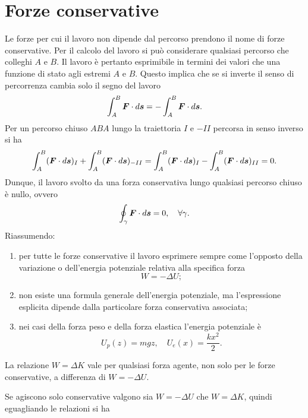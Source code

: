 \section{Forze conservative}
Le forze per cui il lavoro non dipende dal percorso prendono il nome di forze conservative. Per il calcolo del lavoro si può considerare qualsiasi percorso che colleghi $A$ e $B$. Il lavoro è pertanto esprimibile in termini dei valori che una funzione di stato agli estremi $A$ e $B$. Questo implica che se si inverte il senso di percorrenza cambia solo il segno del lavoro
\begin{equation}
    \int_A^B\bm{F}\cdot d\bm{s}=-\int_A^B\bm{F}\cdot d\bm{s}.
\end{equation}
Per un percorso chiuso $ABA$ lungo la traiettoria $I$ e $-II$ percorsa in senso inverso si ha
\begin{equation}
    \int_A^B(\bm{F}\cdot d\bm{s})_I+\int_A^B(\bm{F}\cdot d\bm{s})_{-II}=\int_A^B(\bm{F}\cdot d\bm{s})_I-\int_A^B(\bm{F}\cdot d\bm{s})_{II}=0.
\end{equation}
Dunque, il lavoro svolto da una forza conservativa lungo qualsiasi percorso chiuso è nullo, ovvero
\begin{equation}
    \oint_\gamma\bm{F}\cdot d\bm{s}=0,\quad\forall\gamma.
\end{equation}
Riassumendo:
\begin{enumerate}
    \item per tutte le forze conservative il lavoro esprimere sempre come l'opposto della variazione o dell'energia potenziale relativa alla specifica forza
    \begin{equation}
        W=-\Delta U;
    \end{equation}
    \item non esiste una formula generale dell'energia potenziale, ma l'espressione esplicita dipende dalla particolare forza conservativa associata;
    \item nei casi della forza peso e della forza elastica l'energia potenziale è
    \begin{equation}
        U_p(z)=mgz,\quad U_e(x)=\frac{kx^2}{2}.
    \end{equation}
\end{enumerate}
\begin{obs}
    La relazione $W=\Delta K$ vale per qualsiasi forza agente, non solo per le forze conservative, a differenza di $W=-\Delta U$.
\end{obs}
Se agiscono solo conservative valgono sia $W=-\Delta U$ che $W=\Delta K$, quindi eguagliando le relazioni si ha
